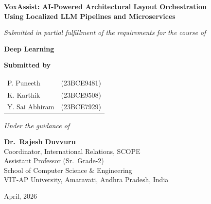 \documentclass[12pt, a4paper]{article}
\begin{document}
\begin{titlepage}
    \centering
    \vspace*{1.5cm}

    {\Large\bfseries VoxAssist: AI-Powered Architectural Layout Orchestration\\[0.4em]
    Using Localized LLM Pipelines and Microservices}

    \vspace{1.2cm}
    {\normalsize\itshape
    Submitted in partial fulfillment of the requirements for the course of}

    \vspace{0.4cm}
    {\large\bfseries Deep Learning}

    \vspace{1.5cm}
    {\normalsize\bfseries Submitted by}

    \vspace{0.5cm}
    \begin{tabular}{ll}
        P. Puneeth      & (23BCE9481) \\[4pt]
        K. Karthik      & (23BCE9508) \\[4pt]
        Y. Sai Abhiram  & (23BCE7929) \\
    \end{tabular}

    \vspace{1.5cm}
    {\normalsize\itshape Under the guidance of}

    \vspace{0.5cm}
    {\normalsize\bfseries Dr.\ Rajesh Duvvuru}\\[4pt]
    {\normalsize Coordinator, International Relations, SCOPE}\\[4pt]
    {\normalsize Assistant Professor (Sr.\ Grade-2)}\\[4pt]
    {\normalsize School of Computer Science \& Engineering}\\[4pt]
    {\normalsize VIT-AP University, Amaravati, Andhra Pradesh, India}

    \vfill
    {\normalsize April, 2026}
\end{titlepage}
\end{document}

